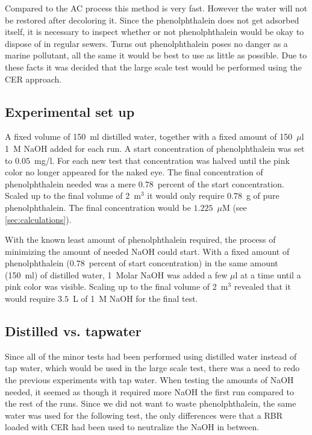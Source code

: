 Compared to the AC process this method is very fast. However the water will not be restored after decoloring it. Since the phenolphthalein does not get adsorbed itself, it is necessary to inspect whether or not phenolphthalein would be okay to dispose of in regular sewers. Turns out phenolphthalein poses no danger as a marine pollutant\cite{url}, all the same it would be best to use as little as possible.
Due to these facts it was decided that the large scale test would be performed using the CER approach.

\subsection{Experimental set up}
A fixed volume of 150~ml distilled water, together with a fixed amount of 150~$\mu$l 1~M NaOH added for each run. A start concentration of phenolphthalein was set to $0.05$~mg/l. For each new test that concentration was halved until the pink color no longer appeared for the naked eye. The final concentration of phenolphthalein needed was a mere $0.78$~percent of the start concentration. Scaled up to the final volume of 2~m$^3$ it would only require $0.78$~g of pure phenolphthalein. The final concentration would be $1.225$~$\mu$M (see \cref{sec:calculations}).

With the known least amount of phenolphthalein required, the process of minimizing the amount of needed NaOH could start. With a fixed amount of phenolphthalein ($0.78$~percent of start concentration) in the same amount (150~ml) of distilled water, 1~Molar NaOH was added a few $\mu$l at a time until a pink color was visible. Scaling up to the final volume of 2~m$^3$ revealed that it would require $3.5$~L of 1~M NaOH for the final test.

\subsection{Distilled vs. tapwater}
Since all of the minor tests had been performed using distilled water instead of tap water, which would be used in the large scale test, there was a need to redo the previous experiments with tap water. When testing the amounts of NaOH needed, it seemed as though it required more NaOH the first run compared to the rest of the runs. Since we did not want to waste phenolphthalein, the same water was used for the following test, the only differences were that a RBR loaded with CER had been used to neutralize the NaOH in between.

